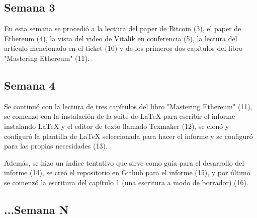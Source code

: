 \subsection{Semana 3}
En esta semana se procedió a la lectura del paper de Bitcoin (3), el paper de Ethereum (4),
 la vista del video de Vitalik en conferencia (5), la lectura del artículo mencionado en el 
 ticket (10) y de los primeros dos capítulos del libro "Mastering Ethereum" (11).
 
\subsection{Semana 4}
Se continuó con la lectura de tres capítulos del libro "Mastering Ethereum" (11), se comenzó 
con la instalación de la suite de LaTeX para escribir el informe instalando LaTeX y el editor 
de texto llamado Texmaker (12), se clonó y configuró la plantilla de LaTeX seleccionada para 
hacer el informe y se configuró para las propias necesidades (13).

Además, se hizo un índice tentativo que sirve como guía para el desarrollo del informe (14), 
se creó el repositorio en Github para el informe (15), y por último se comenzó la escritura del
capítulo 1 (una escritura a modo de borrador) (16).

\subsection{...Semana N}